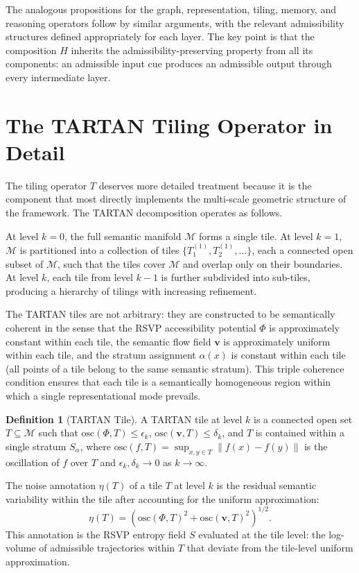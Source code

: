 \documentclass[12pt, a4paper, openany]{book}
\theoremstyle{plain}
\theoremstyle{definition}
\newtheorem{definition}[theorem]{Definition}
\theoremstyle{remark}
\newcommand{\vvec}{\mathbf{v}}
\newcommand{\Sfield}{S}
\begin{document}
The analogous propositions for the graph, representation, tiling, memory, and reasoning operators follow by similar arguments, with the relevant admissibility structures defined appropriately for each layer. The key point is that the composition $H$ inherits the admissibility-preserving property from all its components: an admissible input cue produces an admissible output through every intermediate layer.

\section{The TARTAN Tiling Operator in Detail}

The tiling operator $T$ deserves more detailed treatment because it is the component that most directly implements the multi-scale geometric structure of the framework. The TARTAN decomposition operates as follows.

At level $k=0$, the full semantic manifold $\mathcal{M}$ forms a single tile. At level $k=1$, $\mathcal{M}$ is partitioned into a collection of tiles $\{T_1^{(1)}, T_2^{(1)}, \ldots\}$, each a connected open subset of $\mathcal{M}$, such that the tiles cover $\mathcal{M}$ and overlap only on their boundaries. At level $k$, each tile from level $k-1$ is further subdivided into sub-tiles, producing a hierarchy of tilings with increasing refinement.

The TARTAN tiles are not arbitrary: they are constructed to be semantically coherent in the sense that the RSVP accessibility potential $\Phi$ is approximately constant within each tile, the semantic flow field $\vvec$ is approximately uniform within each tile, and the stratum assignment $\alpha(x)$ is constant within each tile (all points of a tile belong to the same semantic stratum). This triple coherence condition ensures that each tile is a semantically homogeneous region within which a single representational mode prevails.

\begin{definition}[TARTAN Tile]
A TARTAN tile at level $k$ is a connected open set $T \subseteq \mathcal{M}$ such that $\mathrm{osc}(\Phi, T) \leq \epsilon_k$, $\mathrm{osc}(\vvec, T) \leq \delta_k$, and $T$ is contained within a single stratum $S_\alpha$, where $\mathrm{osc}(f, T) = \sup_{x,y \in T} \|f(x) - f(y)\|$ is the oscillation of $f$ over $T$ and $\epsilon_k, \delta_k \to 0$ as $k \to \infty$.
\end{definition}

The noise annotation $\eta(T)$ of a tile $T$ at level $k$ is the residual semantic variability within the tile after accounting for the uniform approximation:
\[
\eta(T) = \left(\mathrm{osc}(\Phi, T)^2 + \mathrm{osc}(\vvec, T)^2\right)^{1/2}.
\]
This annotation is the RSVP entropy field $\Sfield$ evaluated at the tile level: the log-volume of admissible trajectories within $T$ that deviate from the tile-level uniform approximation.
\end{document}
